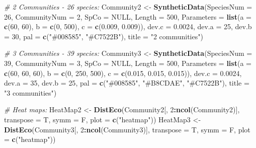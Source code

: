 \documentclass[
]{article}
\newenvironment{Shaded}{\begin{snugshade}}{\end{snugshade}}
\newcommand{\CommentTok}[1]{\textcolor[rgb]{0.56,0.35,0.01}{\textit{#1}}}
\newcommand{\DataTypeTok}[1]{\textcolor[rgb]{0.13,0.29,0.53}{#1}}
\newcommand{\DecValTok}[1]{\textcolor[rgb]{0.00,0.00,0.81}{#1}}
\newcommand{\FloatTok}[1]{\textcolor[rgb]{0.00,0.00,0.81}{#1}}
\newcommand{\KeywordTok}[1]{\textcolor[rgb]{0.13,0.29,0.53}{\textbf{#1}}}
\newcommand{\NormalTok}[1]{#1}
\newcommand{\OperatorTok}[1]{\textcolor[rgb]{0.81,0.36,0.00}{\textbf{#1}}}
\newcommand{\OtherTok}[1]{\textcolor[rgb]{0.56,0.35,0.01}{#1}}
\newcommand{\StringTok}[1]{\textcolor[rgb]{0.31,0.60,0.02}{#1}}
\begin{document}
\begin{Shaded}
\begin{Highlighting}[]
\CommentTok{\# 2 Communities {-} 26 species:}
\NormalTok{Community2 \textless{}{-}}\StringTok{ }\KeywordTok{SyntheticData}\NormalTok{(}\DataTypeTok{SpeciesNum =} \DecValTok{26}\NormalTok{, }\DataTypeTok{CommunityNum =} \DecValTok{2}\NormalTok{, }\DataTypeTok{SpCo =} \OtherTok{NULL}\NormalTok{, }
    \DataTypeTok{Length =} \DecValTok{500}\NormalTok{, }\DataTypeTok{Parameters =} \KeywordTok{list}\NormalTok{(}\DataTypeTok{a =} \KeywordTok{c}\NormalTok{(}\DecValTok{60}\NormalTok{, }\DecValTok{60}\NormalTok{), }\DataTypeTok{b =} \KeywordTok{c}\NormalTok{(}\DecValTok{0}\NormalTok{, }\DecValTok{500}\NormalTok{), }\DataTypeTok{c =} \KeywordTok{c}\NormalTok{(}\FloatTok{0.009}\NormalTok{, }
        \FloatTok{0.009}\NormalTok{)), }\DataTypeTok{dev.c =} \FloatTok{0.0024}\NormalTok{, }\DataTypeTok{dev.a =} \DecValTok{25}\NormalTok{, }\DataTypeTok{dev.b =} \DecValTok{30}\NormalTok{, }\DataTypeTok{pal =} \KeywordTok{c}\NormalTok{(}\StringTok{"\#008585"}\NormalTok{, }
        \StringTok{"\#C7522B"}\NormalTok{), }\DataTypeTok{title =} \StringTok{"2 communities"}\NormalTok{)}

\CommentTok{\# 3 Communities {-} 39 species:}
\NormalTok{Community3 \textless{}{-}}\StringTok{ }\KeywordTok{SyntheticData}\NormalTok{(}\DataTypeTok{SpeciesNum =} \DecValTok{39}\NormalTok{, }\DataTypeTok{CommunityNum =} \DecValTok{3}\NormalTok{, }\DataTypeTok{SpCo =} \OtherTok{NULL}\NormalTok{, }
    \DataTypeTok{Length =} \DecValTok{500}\NormalTok{, }\DataTypeTok{Parameters =} \KeywordTok{list}\NormalTok{(}\DataTypeTok{a =} \KeywordTok{c}\NormalTok{(}\DecValTok{60}\NormalTok{, }\DecValTok{60}\NormalTok{, }\DecValTok{60}\NormalTok{), }\DataTypeTok{b =} \KeywordTok{c}\NormalTok{(}\DecValTok{0}\NormalTok{, }\DecValTok{250}\NormalTok{, }\DecValTok{500}\NormalTok{), }
        \DataTypeTok{c =} \KeywordTok{c}\NormalTok{(}\FloatTok{0.015}\NormalTok{, }\FloatTok{0.015}\NormalTok{, }\FloatTok{0.015}\NormalTok{)), }\DataTypeTok{dev.c =} \FloatTok{0.0024}\NormalTok{, }\DataTypeTok{dev.a =} \DecValTok{35}\NormalTok{, }\DataTypeTok{dev.b =} \DecValTok{25}\NormalTok{, }
    \DataTypeTok{pal =} \KeywordTok{c}\NormalTok{(}\StringTok{"\#008585"}\NormalTok{, }\StringTok{"\#B8CDAE"}\NormalTok{, }\StringTok{"\#C7522B"}\NormalTok{), }\DataTypeTok{title =} \StringTok{"3 communities"}\NormalTok{)}

\CommentTok{\# Heat maps:}
\NormalTok{HeatMap2 \textless{}{-}}\StringTok{ }\KeywordTok{DistEco}\NormalTok{(Community2[, }\DecValTok{2}\OperatorTok{:}\KeywordTok{ncol}\NormalTok{(Community2)], }\DataTypeTok{transpose =}\NormalTok{ T, }\DataTypeTok{symm =}\NormalTok{ F, }
    \DataTypeTok{plot =} \KeywordTok{c}\NormalTok{(}\StringTok{"heatmap"}\NormalTok{))}
\NormalTok{HeatMap3 \textless{}{-}}\StringTok{ }\KeywordTok{DistEco}\NormalTok{(Community3[, }\DecValTok{2}\OperatorTok{:}\KeywordTok{ncol}\NormalTok{(Community3)], }\DataTypeTok{transpose =}\NormalTok{ T, }\DataTypeTok{symm =}\NormalTok{ F, }
    \DataTypeTok{plot =} \KeywordTok{c}\NormalTok{(}\StringTok{"heatmap"}\NormalTok{))}


\end{Highlighting}
\end{Shaded}
\end{document}
